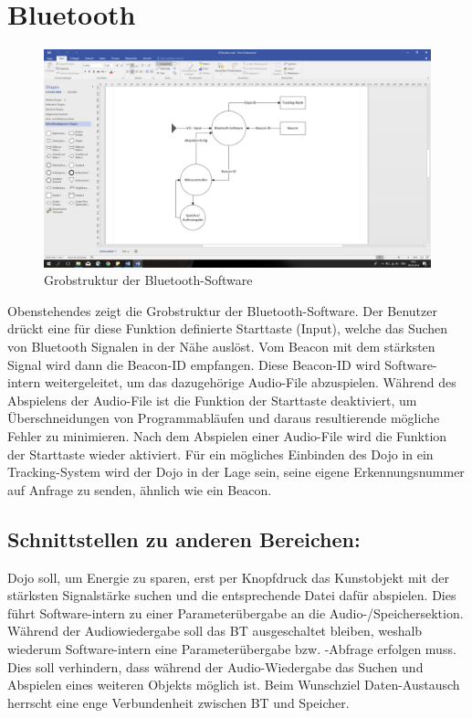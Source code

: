 \section{Bluetooth}

\begin{figure}[H]
\begin{center}
	\includegraphics[width=160mm]{data/Bluetooth.png}
	\caption{Grobstruktur der Bluetooth-Software} %
	\label{fig:first_layer}
\end{center}
\end{figure}

Obenstehendes zeigt die Grobstruktur der Bluetooth-Software. Der Benutzer drückt eine für diese Funktion definierte Starttaste (Input), welche das Suchen von Bluetooth Signalen in der Nähe auslöst. Vom Beacon mit dem stärksten Signal wird dann die Beacon-ID empfangen. Diese Beacon-ID wird Software-intern weitergeleitet, um das dazugehörige Audio-File abzuspielen. Während des Abspielens der Audio-File ist die Funktion der Starttaste deaktiviert, um Überschneidungen von Programmabläufen und daraus resultierende mögliche Fehler zu minimieren. Nach dem Abspielen einer Audio-File wird die Funktion der Starttaste wieder aktiviert. Für ein mögliches Einbinden des Dojo in ein Tracking-System wird der Dojo in der Lage sein, seine eigene Erkennungsnummer auf Anfrage zu senden, ähnlich wie ein Beacon.
\subsection{Schnittstellen zu anderen Bereichen:}
Dojo soll, um Energie zu sparen, erst per Knopfdruck das Kunstobjekt mit der stärksten Signalstärke suchen und die entsprechende Datei dafür abspielen. Dies führt Software-intern zu einer Parameterübergabe an die Audio-/Speichersektion.
Während der Audiowiedergabe soll das BT ausgeschaltet bleiben, weshalb wiederum Software-intern eine Parameterübergabe bzw. -Abfrage erfolgen muss. Dies soll verhindern, dass während der Audio-Wiedergabe das Suchen und Abspielen eines weiteren Objekts möglich ist.
Beim Wunschziel Daten-Austausch herrscht eine enge Verbundenheit zwischen BT und Speicher.
